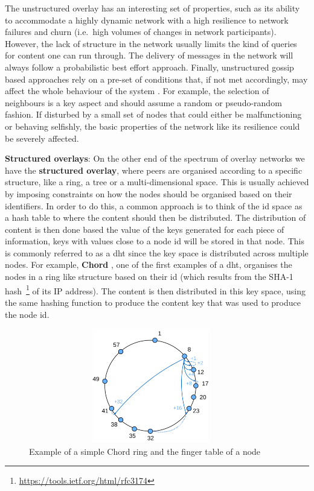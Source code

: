 The unstructured overlay has an interesting set of properties, such as
its ability to accommodate a highly dynamic network with a high
resilience to network failures and churn (i.e.~high volumes of changes
in network participants). However, the lack of structure in the network
usually limits the kind of queries for content one can run through. The
delivery of messages in the network will always follow a probabilistic
best effort approach. Finally, unstructured gossip based approaches rely
on a pre-set of conditions that, if not met accordingly, may affect the
whole behaviour of the system \cite{Alvisi2007}. For example, the selection of
neighbours is a key aspect and should assume a random or pseudo-random
fashion. If disturbed by a small set of nodes that could either be
malfunctioning or behaving selfishly, the basic properties of the
network like its resilience could be severely affected.
\bigskip

\textbf{Structured overlays}: On the other end of the spectrum of overlay
networks we have the \textbf{structured overlay}, where peers are organised
according to a specific structure, like a ring, a tree or a multi-dimensional
space. This is usually achieved by imposing constraints on how the nodes should
be organised based on their identifiers. In order to do this, a common approach
is to think of the \acrshort{id} space as a hash table to where the content
should then be distributed. The distribution of content is then done based the
value of the keys generated for each piece of information, keys with values
close to a node \acrshort{id} will be stored in that node. This is commonly
referred to as a \acrfull{dht} since the key space is distributed across
multiple nodes. For example, \textbf{Chord} \cite{Stoica2001}, one of the first
examples of a \acrshort{dht}, organises the nodes in a ring like structure
based on their \acrshort{id} (which results from the SHA-1
hash~\footnote{\url{https://tools.ietf.org/html/rfc3174}} of its IP address).
The content is then distributed in this key space, using the same hashing
function to produce the content key that was used to produce the node
\acrshort{id}.

\begin{figure}[hb!]
  \centering
  \includegraphics[max height=5cm,max width=0.95\textwidth]{img/chord.png}
  \caption{Example of a simple Chord ring and the finger table of a node}
  \label{fig:chord}
\end{figure}

